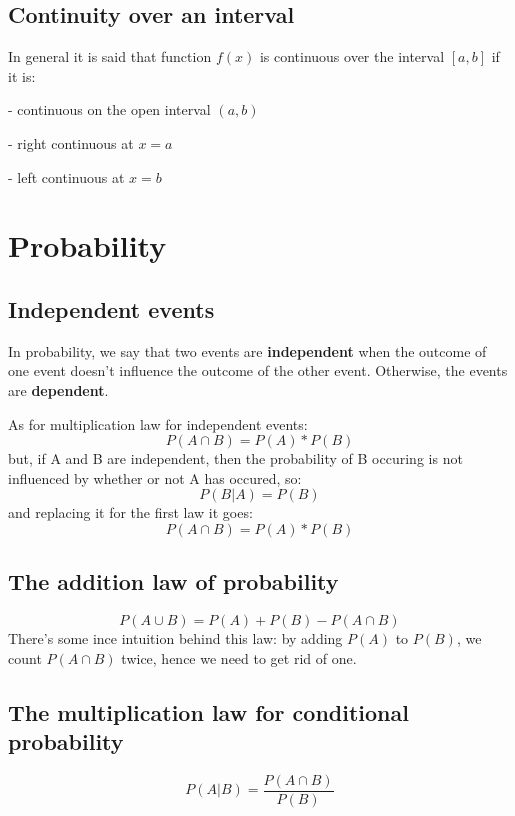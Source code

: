 \documentclass{article}
\begin{document}
\subsection{Continuity over an interval}
In general it is said that function $f(x)$ is continuous over the interval $[a, b]$ if it is:

- continuous on the open interval $(a, b)$

- right continuous at $x = a$

- left continuous at $x = b$

\section{Probability}
\subsection{Independent events}
In probability, we say that two events are \textbf{independent} when the outcome of one
event doesn't influence the outcome of the other event. Otherwise, the events are \textbf{dependent}.

As for multiplication law for independent events:
\begin{equation}
  P(A \cap B) = P(A) * P(B)
\end{equation}
but, if A and B are independent, then the probability of B occuring is not influenced by
whether or not A has occured, so:
\begin{equation}
  P(B|A) = P(B)
\end{equation}
and replacing it for the first law it goes:
\begin{equation}
  P(A \cap B) = P(A) * P(B)
\end{equation}

\subsection{The addition law of probability}
\begin{equation}
  P(A \cup B) = P(A) + P(B) - P(A \cap B)
\end{equation}
There's some ince intuition behind this law: by adding $P(A)$ to $P(B)$, we count $P(A \cap B)$ twice, hence we need to get rid of one.

\subsection{The multiplication law for conditional probability}
\begin{equation}
  P(A|B) = \frac{P(A \cap B)}{P(B)}
\end{equation}
\end{document}
